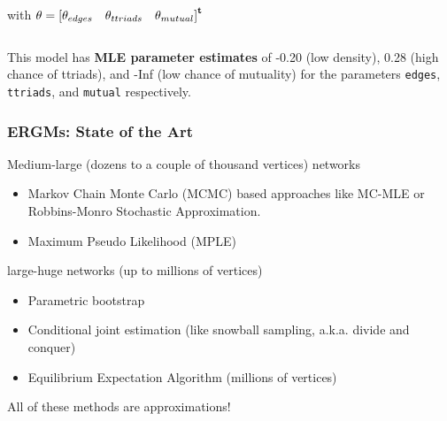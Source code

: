 \documentclass[aspectratio=169, 9pt]{beamer}\usepackage[]{graphicx}\usepackage[]{color}
\begin{document}
\begin{frame}[label=ergm-toyexample]
\begin{columns}[c]
\begin{column}[c]{.4\linewidth}
\normalsize

\noindent with $\theta = {[\theta_{edges}\quad \theta_{ttriads} \quad \theta_{mutual}]}^\mathbf{t}$

\end{column}

\end{columns}



\pause

\vspace{1cm}

This model has \textbf{MLE parameter estimates} of -0.20 (low density), 0.28 (high chance of ttriads), and -Inf (low chance of mutuality) for the parameters \texttt{edges}, \texttt{ttriads}, and \texttt{mutual} respectively.

\end{frame}

\begin{frame}[label=art]
\frametitle{ERGMs: State of the Art}
\pause
Medium-large (dozens to a couple of thousand vertices) networks

\begin{itemize}
\item Markov Chain Monte Carlo (MCMC) based approaches like MC-MLE or Robbins-Monro Stochastic Approximation. \hyperlink{mcmle}{}
\item Maximum Pseudo Likelihood (MPLE)
\end{itemize}\pause

large-huge networks (up to millions of vertices)

\begin{itemize}
\item Parametric bootstrap
\item Conditional joint estimation (like snowball sampling, a.k.a. divide and conquer)
\item Equilibrium Expectation Algorithm (millions of vertices)
\end{itemize}\pause

All of these methods are approximations!

\end{frame}
\end{document}
